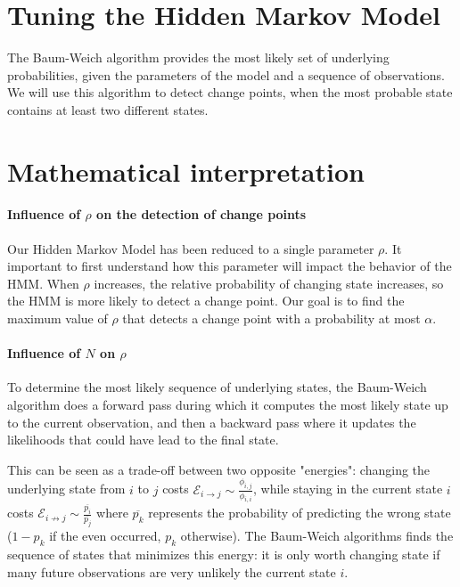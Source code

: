 \documentclass{kththesis}
\begin{document}
\section{Tuning the Hidden Markov Model}

The Baum-Weich algorithm \parencite{baum1966} provides the most likely set of underlying probabilities, given the parameters of the model and a sequence of observations.
We will use this algorithm to detect change points, when the most probable state contains at least two different states.

\section{Mathematical interpretation}

\paragraph{Influence of $\rho$ on the detection of change points}
Our Hidden Markov Model has been reduced to a single parameter $\rho$. It important to first understand how this parameter will impact the behavior of the HMM. When $\rho$ increases, the relative probability of changing state increases, so the HMM is more likely to detect a change point. 
Our goal is to find the maximum value of $\rho$ that detects a change point with a probability at most $\alpha$.

\paragraph{Influence of $N$ on $\rho$}
To determine the most likely sequence of underlying states, the Baum-Weich algorithm does a forward pass during which it computes the most likely state up to the current observation, and then a backward pass where it updates the likelihoods that could have lead to the final state. 

This can be seen as a trade-off between two opposite "energies": changing the underlying state from $i$ to $j$ costs $\mathcal{E}_{i \rightarrow j} \sim \frac{\phi_{i,j}}{\phi_{i,i}}$, while staying in the current state $i$ costs $\mathcal{E}_{i \not\rightarrow j} \sim \frac{\overline{p_i}}{\overline{p_j}}$ where $\overline{p_k}$ represents the probability of predicting the wrong state ($1-p_k$ if the even occurred, $p_k$ otherwise). The Baum-Weich algorithms finds the sequence of states that minimizes this energy: it is only worth changing state if many future observations are very unlikely the current state $i$. 
\end{document}
